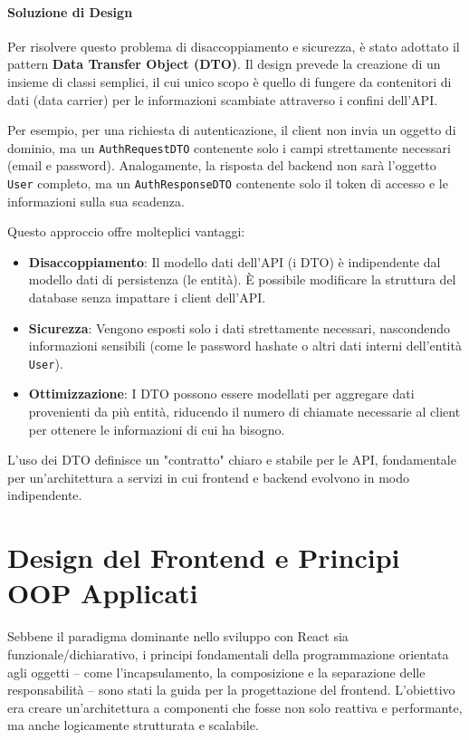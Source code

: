 \documentclass[12pt,a4paper,openright,twoside]{book}
\begin{document}
\paragraph{Soluzione di Design}
Per risolvere questo problema di disaccoppiamento e sicurezza, è stato adottato il pattern \textbf{Data Transfer Object (DTO)}. Il design prevede la creazione di un insieme di classi semplici, il cui unico scopo è quello di fungere da contenitori di dati (data carrier) per le informazioni scambiate attraverso i confini dell'API.

Per esempio, per una richiesta di autenticazione, il client non invia un oggetto di dominio, ma un \texttt{AuthRequestDTO} contenente solo i campi strettamente necessari (email e password). Analogamente, la risposta del backend non sarà l'oggetto \texttt{User} completo, ma un \texttt{AuthResponseDTO} contenente solo il token di accesso e le informazioni sulla sua scadenza.

Questo approccio offre molteplici vantaggi:
\begin{itemize}
    \item \textbf{Disaccoppiamento}: Il modello dati dell'API (i DTO) è indipendente dal modello dati di persistenza (le entità). È possibile modificare la struttura del database senza impattare i client dell'API.
    \item \textbf{Sicurezza}: Vengono esposti solo i dati strettamente necessari, nascondendo informazioni sensibili (come le password hashate o altri dati interni dell'entità \texttt{User}).
    \item \textbf{Ottimizzazione}: I DTO possono essere modellati per aggregare dati provenienti da più entità, riducendo il numero di chiamate necessarie al client per ottenere le informazioni di cui ha bisogno.
\end{itemize}

L'uso dei DTO definisce un "contratto" chiaro e stabile per le API, fondamentale per un'architettura a servizi in cui frontend e backend evolvono in modo indipendente.

\section{Design del Frontend e Principi OOP Applicati}
\label{sec:design_frontend}

Sebbene il paradigma dominante nello sviluppo con React sia funzionale/dichiarativo, i principi fondamentali della programmazione orientata agli oggetti -- come l'incapsulamento, la composizione e la separazione delle responsabilità -- sono stati la guida per la progettazione del frontend. L'obiettivo era creare un'architettura a componenti che fosse non solo reattiva e performante, ma anche logicamente strutturata e scalabile.
\end{document}
